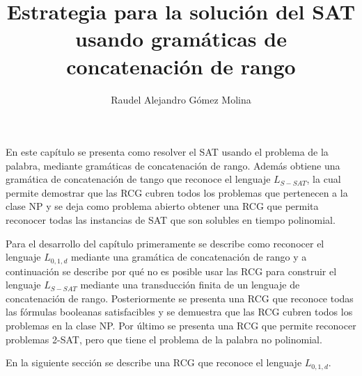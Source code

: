 \documentclass[12pt]{article}
\title{Estrategia para la solución del SAT usando gramáticas de concatenación de rango}
\author{Raudel Alejandro Gómez Molina}
\begin{document}
\maketitle





En este capítulo se presenta como resolver el SAT usando el problema de la palabra, mediante gramáticas de concatenación
de rango. Además obtiene una gramática de concatenación de tango que reconoce el lenguaje $L_{S-SAT}$, la cual permite demostrar
que las RCG cubren todos los problemas que pertenecen a la clase NP y se deja como problema abierto
obtener una RCG que permita reconocer todas las instancias de SAT que son solubles en tiempo polinomial.

Para el desarrollo del capítulo primeramente se describe como reconocer el lenguaje $L_{0,1,d}$ mediante una gramática de concatenación 
de rango y a continuación se describe por qué no es posible usar las RCG para construir el lenguaje 
$L_{S-SAT}$ mediante una transducción finita de un lenguaje de concatenación de rango.  Posteriormente 
se presenta una RCG que reconoce todas las fórmulas booleanas satisfacibles y se demuestra que las RCG 
cubren todos los problemas en la clase NP. Por último se presenta una RCG que permite reconocer problemas 
2-SAT, pero que tiene el problema de la palabra no polinomial.

En la siguiente sección se describe una RCG que reconoce el lenguaje $L_{0,1,d}$.
\end{document}
